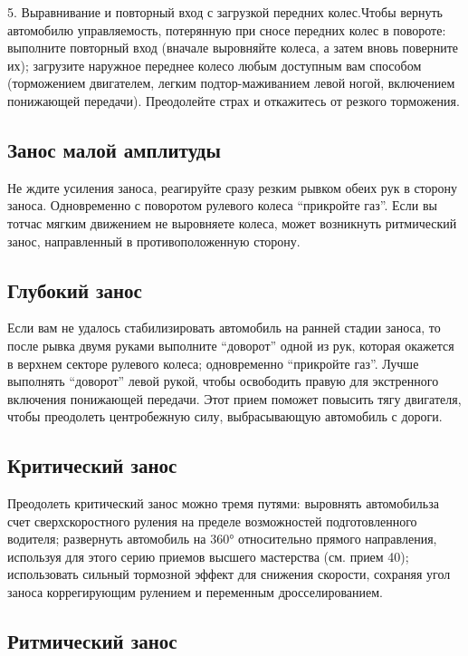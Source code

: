 5. Выравнивание и повторный вход с загрузкой передних колес.Чтобы вернуть автомобилю управляемость, потерянную при сносе передних колес в повороте: выполните повторный вход (вначале выровняйте колеса, а затем вновь поверните их); загрузите наружное переднее колесо любым доступным вам способом (торможением двигателем, легким подтор-маживанием левой ногой, включением понижающей передачи). Преодолейте страх и откажитесь от резкого торможения.

\subsection{Занос малой амплитуды} 

Не ждите усиления заноса, реагируйте сразу резким рывком обеих рук в сторону заноса. Одновременно с поворотом рулевого колеса “прикройте газ”. Если вы тотчас мягким движением не выровняете колеса, может возникнуть ритмический занос, направленный в противоположенную сторону.

\subsection{Глубокий занос}

Если вам не удалось стабилизировать автомобиль на ранней стадии заноса, то после рывка двумя руками выполните “доворот” одной из рук, которая окажется в верхнем секторе рулевого колеса; одновременно “прикройте газ”. Лучше выполнять “доворот” левой рукой, чтобы освободить правую для экстренного включения понижающей передачи. Этот прием поможет повысить тягу двигателя, чтобы преодолеть центробежную силу, выбрасывающую автомобиль с дороги.

\subsection{Критический занос}

Преодолеть критический занос можно тремя путями: выровнять автомобильза счет сверхскоростного руления на пределе возможностей подготовленного водителя; развернуть автомобиль на 360° относительно прямого направления, используя для этого серию приемов высшего мастерства (см. прием 40); использовать сильный тормозной эффект для снижения скорости, сохраняя угол заноса коррегирующим рулением и переменным дросселированием.

\subsection{Ритмический занос}

